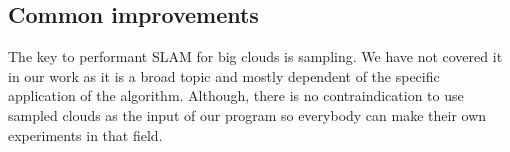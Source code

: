 \documentclass[titlepage]{article}
\begin{document}
\subsection{Common improvements}
The key to performant SLAM for big clouds is sampling. We have not covered it in our work as it is a broad topic and mostly dependent of the specific application of the algorithm. Although, there is no contraindication to use sampled clouds as the input of our program so everybody can make their own experiments in that field.

\newpage
\printbibliography
\end{document}
